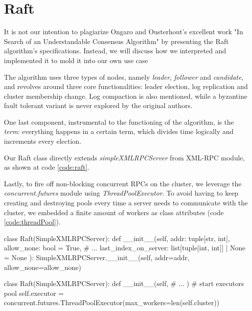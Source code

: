\section{Raft} \label{sec:raft}

It is not our intention to plagiarize Ongaro and Ousterhout's excellent work "In Search of an Understandable Consensus Algorithm" \cite{raft} by presenting the Raft algorithm's specifications. Instead, we will discuss how we interpreted and implemented it to mold it into our own use case

The algorithm uses three types of nodes, namely \textit{leader}, \textit{follower} and \textit{candidate}, and revolves around three core functionalities: leader election, log replication and cluster membership change. Log compaction is also mentioned, while a byzantine fault tolerant variant is never explored by the original authors.

One last component, instrumental to the functioning of the algorithm, is the \textit{term}: everything happens in a certain term, which divides time logically and increments every election. 

Our Raft class directly extends \textit{simpleXMLRPCServer} from XML-RPC module, as shown at code \ref{code:raft}.

Lastly, to fire off non-blocking concurrent RPCs on the cluster, we leverage the \textit{concurrent.futures} module using \textit{ThreadPoolExecutor}. To avoid having to keep creating and destroying pools every time a server needs to communicate with the cluster, we embedded a finite amount of workers as class attributes (code \ref{code:threadPool}).

\begin{python}[label={code:raft}, caption={Class Raft definition}]
class Raft(SimpleXMLRPCServer):
    def __init__(self, 
                 addr: tuple[str, int],
                 allow_none: bool = True,
                 # ...
                 last_index_on_server: list[tuple[int, int]] | None = None
                 ):
        SimpleXMLRPCServer.__init__(self, addr=addr, allow_none=allow_none)
\end{python}

\begin{python}[label={code:threadPool}, caption={ThreadPoolExecutor workers}]
class Raft(SimpleXMLRPCServer):
    def __init__(self, 
                 # ...
                 )
        # start executors pool
        self.executor = concurrent.futures.ThreadPoolExecutor(max_workers=len(self.cluster))
\end{python}

